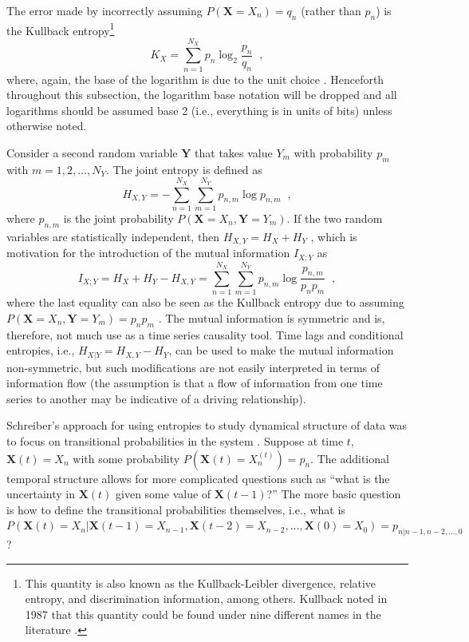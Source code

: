 \documentclass{article}[10pt]
\begin{document}
The error made by incorrectly assuming $P(\mathbf{X}=X_n) = q_n$ (rather than $p_n$) is the Kullback entropy\footnote{This quantity is also known as the Kullback-Leibler divergence, relative entropy, and discrimination information, among others.  Kullback noted in 1987 that this quantity could be found under nine different names in the literature \cite{Kullback1987}.}
\begin{equation}
K_X =  \sum_{n=1}^{N_X} p_n \log_2 \frac{p_n}{q_n}\;\;,
\end{equation}
where, again, the base of the logarithm is due to the unit choice \cite{Kullback1951,Schreiber2000,Schindler2007,Kaiser2002}.  Henceforth throughout this subsection, the logarithm base notation will be dropped and all logarithms should be assumed base 2 (i.e., everything is in units of bits) unless otherwise noted.

Consider a second random variable $\mathbf{Y}$ that takes value $Y_m$ with probability $p_m$ with $m = 1,2,\ldots,N_Y$.  The joint entropy is defined as
\begin{equation}
H_{X,Y} = -\sum_{n=1}^{N_X} \sum_{m=1}^{N_Y} p_{n,m} \log p_{n,m}\;\;,
\end{equation}
where $p_{n,m}$ is the joint probability $P(\mathbf{X}=X_n,\mathbf{Y}=Y_m)$.  If the two random variables are statistically independent, then $H_{X,Y} = H_X+H_Y$ \cite{Schindler2007}, which is motivation for the introduction of the mutual information $I_{X;Y}$ as
\begin{equation}
I_{X;Y} = H_X + H_Y - H_{X,Y} = \sum_{n=1}^{N_X} \sum_{m=1}^{N_Y} p_{n,m} \log \frac{p_{n,m}}{p_n p_m}\;\;,
\end{equation}
where the last equality can also be seen as the Kullback entropy due to assuming $P(\mathbf{X}=X_n,\mathbf{Y}=Y_m)=p_n p_m$ \cite{Kaiser2002}.  The mutual information is symmetric and is, therefore, not much use as a time series causality tool.  Time lags and conditional entropies, i.e., $H_{X|Y} = H_{X,Y} - H_{Y}$, can be used to make the mutual information non-symmetric, but such modifications are not easily interpreted in terms of information flow \cite{Schreiber2000} (the assumption is that a flow of information from one time series to another may be indicative of a driving relationship).  

Schreiber's approach for using entropies to study dynamical structure of data was to focus on transitional probabilities in the system \cite{Schreiber2000}.  Suppose at time $t$, $\mathbf{X}(t) = X_n$ with some probability $P(\mathbf{X}(t) = X_n^{(t)})=p_n$.  The additional temporal structure allows for more complicated questions such as ``what is the uncertainty in $\mathbf{X}(t)$ given some value of $\mathbf{X}(t-1)$?''  The more basic question is how to define the transitional probabilities themselves, i.e., what is $P(\mathbf{X}(t) = X_n | \mathbf{X}(t-1) = X_{n-1},\mathbf{X}(t-2) = X_{n-2},\ldots,\mathbf{X}(0) = X_{0}) = p_{n|n-1,n-2,\ldots,0}$?
\end{document}
